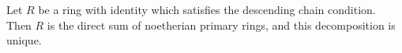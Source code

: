 Let $R$ be a ring with identity which satisfies the descending chain condition. Then $R$ is the direct sum of noetherian primary rings, and this decomposition is unique.
